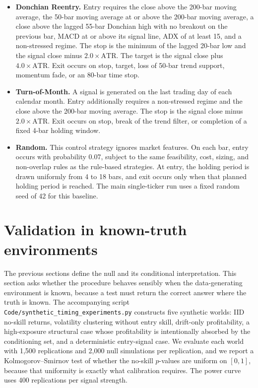 \documentclass[preprint,12pt]{elsarticle}
\theoremstyle{definition}
\begin{document}
\begin{itemize}
\item \textbf{Donchian Reentry.} Entry requires the close above the 200-bar moving average, the 50-bar moving average at or above the 200-bar moving average, a close above the lagged 55-bar Donchian high with no breakout on the previous bar, MACD at or above its signal line, ADX of at least 15, and a non-stressed regime. The stop is the minimum of the lagged 20-bar low and the signal close minus \(2.0\times \mathrm{ATR}\). The target is the signal close plus \(4.0\times \mathrm{ATR}\). Exit occurs on stop, target, loss of 50-bar trend support, momentum fade, or an 80-bar time stop.

\item \textbf{Turn-of-Month.} A signal is generated on the last trading day of each calendar month. Entry additionally requires a non-stressed regime and the close above the 200-bar moving average. The stop is the signal close minus \(2.0\times \mathrm{ATR}\). Exit occurs on stop, break of the trend filter, or completion of a fixed 4-bar holding window.

\item \textbf{Random.} This control strategy ignores market features. On each bar, entry occurs with probability 0.07, subject to the same feasibility, cost, sizing, and non-overlap rules as the rule-based strategies. At entry, the holding period is drawn uniformly from 4 to 18 bars, and exit occurs only when that planned holding period is reached. The main single-ticker run uses a fixed random seed of 42 for this baseline.
\end{itemize}

\section{Validation in known-truth environments}
\label{sec:supp-synthetic}

The previous sections define the null and its conditional interpretation. This section asks whether the procedure behaves sensibly when the data-generating environment is known, because a test must return the correct answer where the truth is known. The accompanying script \texttt{Code/synthetic\_timing\_experiments.py} constructs five synthetic worlds: IID no-skill returns, volatility clustering without entry skill, drift-only profitability, a high-exposure structural case whose profitability is intentionally absorbed by the conditioning set, and a deterministic entry-signal case. We evaluate each world with 1{,}500 replications and 2{,}000 null simulations per replication, and we report a Kolmogorov--Smirnov test of whether the no-skill $p$-values are uniform on $[0,1]$, because that uniformity is exactly what calibration requires. The power curve uses 400 replications per signal strength.
\end{document}
